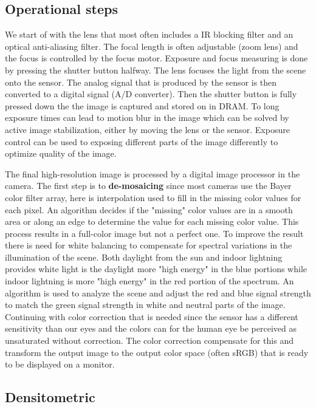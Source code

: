 \subsection*{Operational steps}
We start of with the lens that most often includes a IR blocking filter and an optical anti-aliasing filter. The focal length is often adjustable (zoom lens) and the focus is controlled by the focus motor. Exposure and focus measuring is done by pressing the shutter button halfway. The lens focuses the light from the scene onto the sensor. The analog signal that is produced by the sensor is then converted to a digital signal (A/D converter). Then the shutter button is fully pressed down the the image is captured and stored on in DRAM. To long exposure times can lead to motion blur in the image which can be solved by active image stabilization, either by moving the lens or the sensor. Exposure control can be used to exposing different parts of the image differently to optimize quality of the image. 


The final high-resolution image is processed by a digital image processor in the camera. The first step is to \textbf{de-mosaicing} since most cameras use the Bayer color filter array, here is interpolation used to fill in the missing color values for each pixel. An algorithm decides if the "missing" color values are in a smooth area or along an edge to determine the value for each missing color value. This process results in a full-color image but not a perfect one. To improve the result there is need for white balancing to compensate for spectral variations in the illumination of the scene. Both daylight from the sun and indoor lightning provides white light is the daylight more "high energy" in the blue portions while indoor lightning is more "high energy" in the red portion of the spectrum. An algorithm is used to analyze the scene and adjust the red and blue signal strength to match the green signal strength in white and neutral parts of the image. Continuing with color correction that is needed since the sensor has a different sensitivity than our eyes and the colors can for the human eye be perceived as unsaturated without correction. The color correction compensate for this and transform the output image to the output color space (often sRGB) that is ready to be displayed on a monitor.  


\subsection*{Densitometric}

